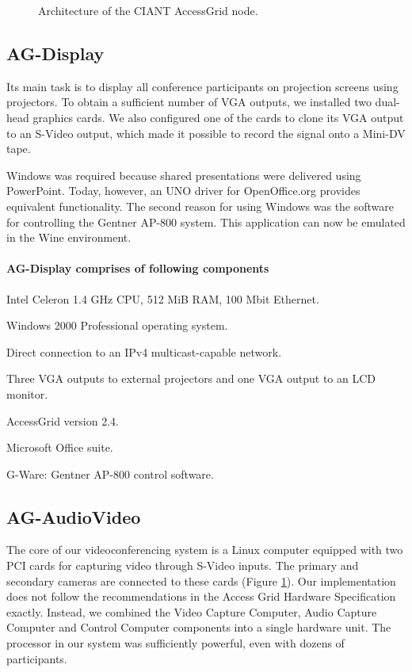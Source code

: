 \begin{figure}
\centering

\caption{Architecture of the CIANT AccessGrid node.}
\label{fig:CIANT-AG-node}
\end{figure}

\subsection{AG-Display}
Its main task is to display all conference participants on projection screens using projectors. To obtain a sufficient number of VGA outputs, we installed two dual-head graphics cards. We also configured one of the cards to clone its VGA output to an S-Video output, which made it possible to record the signal onto a Mini-DV tape.

Windows was required because shared presentations were delivered using PowerPoint. Today, however, an UNO driver for OpenOffice.org provides equivalent functionality. The second reason for using Windows was the software for controlling the Gentner AP-800 system. This application can now be emulated in the Wine environment.

\paragraph*{AG-Display comprises of following components}
\begin{paklist}
\item Intel Celeron 1.4 GHz CPU, 512 MiB RAM, 100 Mbit Ethernet.
\item Windows 2000 Professional operating system.
\item Direct connection to an IPv4 multicast-capable network.
\item Three VGA outputs to external projectors and one VGA output to an LCD monitor.
\item AccessGrid version 2.4.
\item Microsoft Office suite.
\item G-Ware: Gentner AP-800 control software.
\end{paklist}

\subsection{AG-AudioVideo}
The core of our videoconferencing system is a Linux computer equipped with two PCI cards for capturing video through S-Video inputs. The primary and secondary cameras are connected to these cards (Figure \ref{fig:CIANT-AG-node}). Our implementation does not follow the recommendations in the Access Grid Hardware Specification \cite{AG-HardwareSpecification} exactly. Instead, we combined the Video Capture Computer, Audio Capture Computer and Control Computer components into a single hardware unit. The processor in our system was sufficiently powerful, even with dozens of participants.

